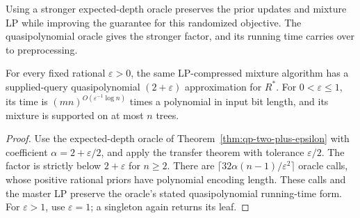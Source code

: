Using a stronger expected-depth oracle preserves the prior updates and
mixture LP while improving the guarantee for this randomized objective.
The quasipolynomial oracle gives the stronger factor, and its running
time carries over to preprocessing.
\begin{corollary}
\label{cor:randomized-quasipolynomial}
For every fixed rational $\varepsilon>0$, the same LP-compressed
mixture algorithm has a supplied-query quasipolynomial
$(2+\varepsilon)$ approximation for $R^*$. For
$0<\varepsilon\le1$, its time is
$(mn)^{O(\varepsilon^{-1}\log n)}$ times a polynomial in input
bit length, and its mixture is supported on at most $n$ trees.
\end{corollary}
\begin{proof}
Use the expected-depth oracle of
Theorem~\ref{thm:qp-two-plus-epsilon} with coefficient
$\alpha=2+\varepsilon/2$, and apply the transfer theorem with
tolerance $\varepsilon/2$. The factor is strictly below
$2+\varepsilon$ for $n\ge2$. There are
$\lceil32\alpha(n-1)/\varepsilon^2\rceil$ oracle calls, whose
positive rational priors have polynomial encoding length. These
calls and the master LP preserve the oracle's stated
quasipolynomial running-time form. For $\varepsilon>1$, use
$\varepsilon=1$; a singleton again returns its leaf.
\end{proof}
